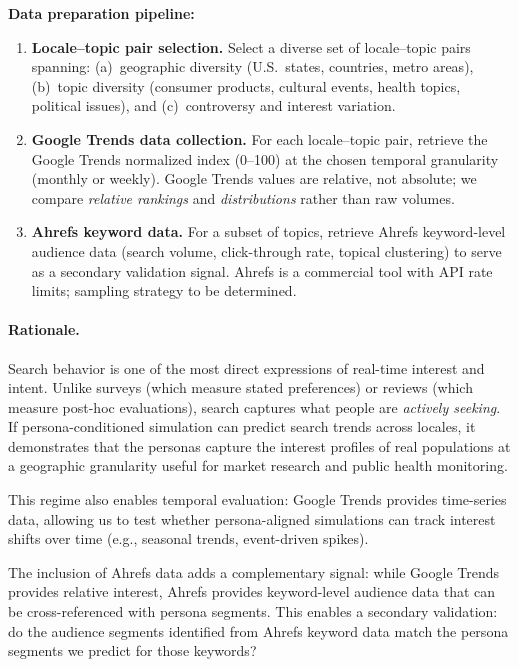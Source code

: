\medskip\noindent\textbf{Data preparation pipeline:}
\begin{enumerate}
    \item \textbf{Locale--topic pair selection.} Select a diverse set of locale--topic pairs spanning: (a)~geographic diversity (U.S.\ states, countries, metro areas), (b)~topic diversity (consumer products, cultural events, health topics, political issues), and (c)~controversy and interest variation.
    \item \textbf{Google Trends data collection.} For each locale--topic pair, retrieve the Google Trends normalized index (0--100) at the chosen temporal granularity (monthly or weekly). Google Trends values are relative, not absolute; we compare \emph{relative rankings} and \emph{distributions} rather than raw volumes.
    \item \textbf{Ahrefs keyword data.} For a subset of topics, retrieve Ahrefs keyword-level audience data (search volume, click-through rate, topical clustering) to serve as a secondary validation signal. Ahrefs is a commercial tool with API rate limits; sampling strategy to be determined.
\end{enumerate}

\paragraph{Rationale.}
Search behavior is one of the most direct expressions of real-time interest and intent.
Unlike surveys (which measure stated preferences) or reviews (which measure post-hoc evaluations), search captures what people are \emph{actively seeking}.
If persona-conditioned simulation can predict search trends across locales, it demonstrates that the personas capture the interest profiles of real populations at a geographic granularity useful for market research and public health monitoring.

This regime also enables temporal evaluation: Google Trends provides time-series data, allowing us to test whether persona-aligned simulations can track interest shifts over time (e.g., seasonal trends, event-driven spikes).

The inclusion of Ahrefs data adds a complementary signal: while Google Trends provides relative interest, Ahrefs provides keyword-level audience data that can be cross-referenced with persona segments.
This enables a secondary validation: do the audience segments identified from Ahrefs keyword data match the persona segments we predict for those keywords?

